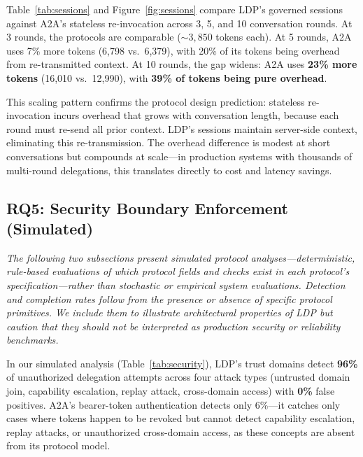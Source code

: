 \documentclass[11pt,a4paper]{article}
\newcommand{\ldp}{\textsc{LDP}}
\newcommand{\atoa}{\textsc{A2A}}
\begin{document}


Table~\ref{tab:sessions} and Figure~\ref{fig:sessions} compare \ldp{}'s governed sessions against \atoa{}'s stateless re-invocation across 3, 5, and 10 conversation rounds. At 3 rounds, the protocols are comparable (${\sim}3{,}850$ tokens each). At 5 rounds, \atoa{} uses 7\% more tokens (6,798 vs.\ 6,379), with 20\% of its tokens being overhead from re-transmitted context. At 10 rounds, the gap widens: \atoa{} uses \textbf{23\% more tokens} (16,010 vs.\ 12,990), with \textbf{39\% of tokens being pure overhead}.

This scaling pattern confirms the protocol design prediction: stateless re-invocation incurs overhead that grows with conversation length, because each round must re-send all prior context. \ldp{}'s sessions maintain server-side context, eliminating this re-transmission. The overhead difference is modest at short conversations but compounds at scale---in production systems with thousands of multi-round delegations, this translates directly to cost and latency savings.

\subsection{RQ5: Security Boundary Enforcement (Simulated)}

\emph{The following two subsections present simulated protocol analyses---deterministic, rule-based evaluations of which protocol fields and checks exist in each protocol's specification---rather than stochastic or empirical system evaluations. Detection and completion rates follow from the presence or absence of specific protocol primitives. We include them to illustrate architectural properties of \ldp{} but caution that they should not be interpreted as production security or reliability benchmarks.}



In our simulated analysis (Table~\ref{tab:security}), \ldp{}'s trust domains detect \textbf{96\%} of unauthorized delegation attempts across four attack types (untrusted domain join, capability escalation, replay attack, cross-domain access) with \textbf{0\%} false positives. \atoa{}'s bearer-token authentication detects only 6\%---it catches only cases where tokens happen to be revoked but cannot detect capability escalation, replay attacks, or unauthorized cross-domain access, as these concepts are absent from its protocol model.
\end{document}
